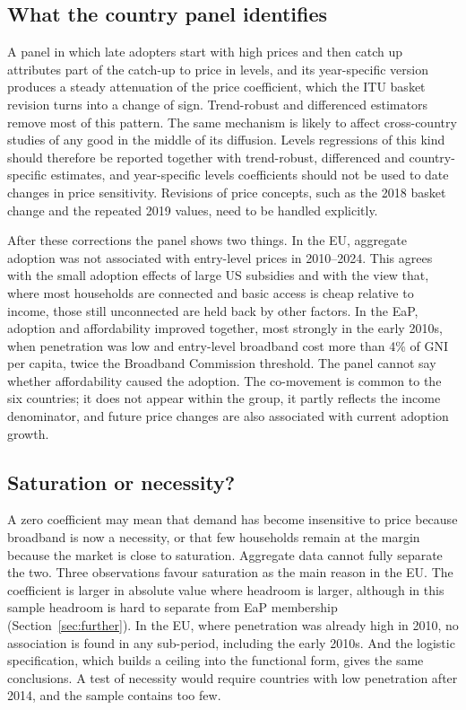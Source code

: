 \documentclass[pdflatex,sn-basic]{sn-jnl}
\begin{document}
\subsection{What the country panel identifies}

A panel in which late adopters start with high prices and then catch up attributes part of the catch-up to price in levels, and its year-specific version produces a steady attenuation of the price coefficient, which the ITU basket revision turns into a change of sign. Trend-robust and differenced estimators remove most of this pattern. The same mechanism is likely to affect cross-country studies of any good in the middle of its diffusion. Levels regressions of this kind should therefore be reported together with trend-robust, differenced and country-specific estimates, and year-specific levels coefficients should not be used to date changes in price sensitivity. Revisions of price concepts, such as the 2018 basket change and the repeated 2019 values, need to be handled explicitly.

After these corrections the panel shows two things. In the EU, aggregate adoption was not associated with entry-level prices in 2010--2024. This agrees with the small adoption effects of large US subsidies \citep{mendez2021lifeline} and with the view that, where most households are connected and basic access is cheap relative to income, those still unconnected are held back by other factors. In the EaP, adoption and affordability improved together, most strongly in the early 2010s, when penetration was low and entry-level broadband cost more than 4\% of GNI per capita, twice the Broadband Commission threshold. The panel cannot say whether affordability caused the adoption. The co-movement is common to the six countries; it does not appear within the group, it partly reflects the income denominator, and future price changes are also associated with current adoption growth.

\subsection{Saturation or necessity?}

A zero coefficient may mean that demand has become insensitive to price because broadband is now a necessity, or that few households remain at the margin because the market is close to saturation. Aggregate data cannot fully separate the two. Three observations favour saturation as the main reason in the EU. The coefficient is larger in absolute value where headroom is larger, although in this sample headroom is hard to separate from EaP membership (Section~\ref{sec:further}). In the EU, where penetration was already high in 2010, no association is found in any sub-period, including the early 2010s. And the logistic specification, which builds a ceiling into the functional form, gives the same conclusions. A test of necessity would require countries with low penetration after 2014, and the sample contains too few.
\end{document}
